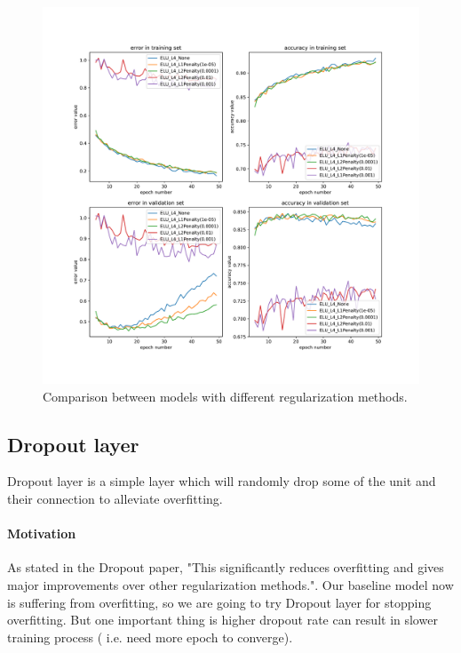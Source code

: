 \documentclass{article}
\begin{document}
\begin{figure}[tb]
\begin{center}
\centerline{\includegraphics[width=\columnwidth]{fig/reg.pdf}}
\caption{Comparison between models with different regularization methods.}
\label{fig:base_reg}
\end{center}
\end{figure} 


\subsection{Dropout layer}
Dropout layer \citep{JMLR:v15:srivastava14a} is a simple layer which will randomly drop some of the unit and their connection to alleviate  overfitting.
\paragraph{Motivation}
As stated in the Dropout paper, "This significantly
reduces overfitting and gives major improvements over other regularization methods."\citep{JMLR:v15:srivastava14a}. Our baseline model now is suffering from overfitting, so we are going to try Dropout layer for stopping overfitting. But one important thing is higher dropout rate can result in slower training process ( i.e.  need more epoch to converge). 
\end{document}
